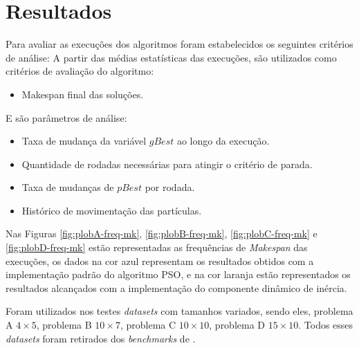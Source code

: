 \section{Resultados}
Para avaliar as execuções dos algoritmos foram estabelecidos os seguintes critérios de análise:
A partir das médias estatísticas das execuções, são utilizados como critérios de avaliação do algoritmo:
\begin{itemize}
\item Makespan final das soluções.
\end{itemize}

\noindent E são parâmetros de análise:
\begin{itemize}
\item Taxa de mudança da variável $gBest$ ao longo da execução.
\item Quantidade de rodadas necessárias para atingir o critério de parada.
\item Taxa de mudanças de $pBest$ por rodada.
\item Histórico de movimentação das partículas.
\end{itemize}

Nas Figuras \ref{fig:plobA-freq-mk}, \ref{fig:plobB-freq-mk}, \ref{fig:plobC-freq-mk} e \ref{fig:plobD-freq-mk} 
estão representadas as frequências de \textit{Makespan} das execuções, os dados na cor azul representam os resultados obtidos com a implementação padrão do algoritmo PSO, e na cor laranja estão representados os resultados alcançados com a implementação do componente dinâmico de inércia.

Foram utilizados nos testes \textit{datasets} com tamanhos variados, sendo eles, 
problema A $4 \times 5$,
problema B $10 \times 7$,
problema C $10 \times 10$,
problema D $15 \times 10$.
Todos esses \textit{datasets} foram retirados dos \textit{benchmarks} de \cite{Kacem2002}.
%



